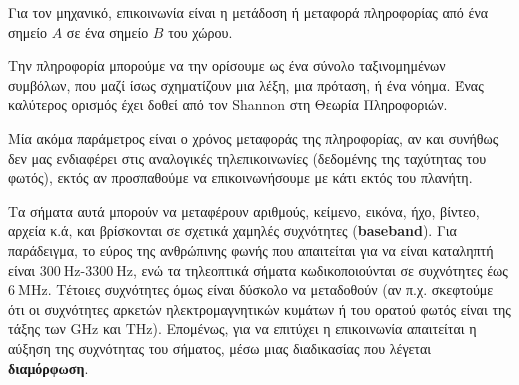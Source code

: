 \documentclass[11pt,a4paper,notitlepage,fleqn,final]{article}
\begin{document}
Για τον μηχανικό, επικοινωνία είναι η μετάδοση ή μεταφορά πληροφορίας από ένα σημείο \( A \) σε ένα σημείο \( B \) του χώρου.

\begin{center}
\end{center}

Την πληροφορία μπορούμε να την ορίσουμε ως ένα σύνολο ταξινομημένων συμβόλων, που μαζί ίσως
σχηματίζουν μια λέξη, μια πρόταση, ή ένα νόημα. Ένας καλύτερος ορισμός έχει δοθεί από τον
Shannon στη Θεωρία Πληροφοριών.

Μία ακόμα παράμετρος είναι ο χρόνος μεταφοράς της πληροφορίας, αν και συνήθως δεν μας
ενδιαφέρει στις αναλογικές τηλεπικοινωνίες (δεδομένης της ταχύτητας του φωτός), εκτός
αν προσπαθούμε να επικοινωνήσουμε με κάτι εκτός του πλανήτη.

Τα σήματα αυτά μπορούν να μεταφέρουν αριθμούς, κείμενο, εικόνα, ήχο, βίντεο, αρχεία κ.ά, και
βρίσκονται σε σχετικά χαμηλές συχνότητες (\textbf{baseband}). Για παράδειγμα, το εύρος της ανθρώπινης φωνής που
απαιτείται για να είναι καταληπτή είναι \( 300 \ \mathrm{Hz} \)-\( 3300\ \mathrm{Hz} \), ενώ
τα τηλεοπτικά σήματα κωδικοποιούνται σε συχνότητες έως \( 6 \ \mathrm{MHz} \). Τέτοιες
συχνότητες όμως είναι δύσκολο να μεταδοθούν (αν π.χ. σκεφτούμε ότι οι συχνότητες αρκετών
ηλεκτρομαγνητικών κυμάτων ή του ορατού φωτός είναι της τάξης των \( \mathrm{GHz} \) και
\( \mathrm{THz} \)). Επομένως, για να επιτύχει η επικοινωνία απαιτείται η αύξηση της
συχνότητας του σήματος, μέσω μιας διαδικασίας που λέγεται \textbf{διαμόρφωση}.

\end{document}

